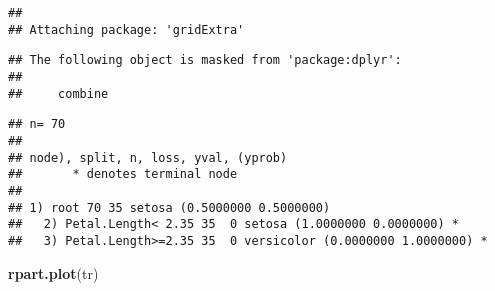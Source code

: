 \documentclass[]{article}
\newenvironment{Shaded}{\begin{snugshade}}{\end{snugshade}}
\newcommand{\CommentTok}[1]{\textcolor[rgb]{0.56,0.35,0.01}{\textit{#1}}}
\newcommand{\DataTypeTok}[1]{\textcolor[rgb]{0.13,0.29,0.53}{#1}}
\newcommand{\DecValTok}[1]{\textcolor[rgb]{0.00,0.00,0.81}{#1}}
\newcommand{\FloatTok}[1]{\textcolor[rgb]{0.00,0.00,0.81}{#1}}
\newcommand{\KeywordTok}[1]{\textcolor[rgb]{0.13,0.29,0.53}{\textbf{#1}}}
\newcommand{\NormalTok}[1]{#1}
\newcommand{\OperatorTok}[1]{\textcolor[rgb]{0.81,0.36,0.00}{\textbf{#1}}}
\newcommand{\OtherTok}[1]{\textcolor[rgb]{0.56,0.35,0.01}{#1}}
\newcommand{\StringTok}[1]{\textcolor[rgb]{0.31,0.60,0.02}{#1}}
\begin{document}
\begin{verbatim}
## 
## Attaching package: 'gridExtra'
\end{verbatim}

\begin{verbatim}
## The following object is masked from 'package:dplyr':
## 
##     combine
\end{verbatim}

\begin{Shaded}
\end{Shaded}

\begin{verbatim}
## n= 70 
## 
## node), split, n, loss, yval, (yprob)
##       * denotes terminal node
## 
## 1) root 70 35 setosa (0.5000000 0.5000000)  
##   2) Petal.Length< 2.35 35  0 setosa (1.0000000 0.0000000) *
##   3) Petal.Length>=2.35 35  0 versicolor (0.0000000 1.0000000) *
\end{verbatim}

\begin{Shaded}
\begin{Highlighting}[]
\KeywordTok{rpart.plot}\NormalTok{(tr)}
\end{Highlighting}
\end{Shaded}
\end{document}
